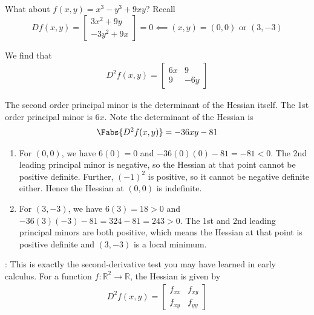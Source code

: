 \documentclass{article}
\begin{document}
What about $f(x, y) = x^3 - y^3 + 9xy$? Recall
\[
  D f(x, y) = \left[\begin{matrix}
    3x^2 + 9y \\
    -3y^2 + 9x
  \end{matrix}\right]
  = 0
  \impliedby (x, y) = (0, 0) \text{ or } (3, -3)
\]

We find that
\begin{equation}
  \begin{array}{c}
    D^2 f(x, y) = \left[\begin{matrix}
        6x & 9 \\
        9  & -6y
    \end{matrix}\right]
  \end{array}
  \nonumber
\end{equation}

The second order principal minor is the determinant of the Hessian itself. The 1st order principal minor is $6x$. Note the determinant of the Hessian is
\begin{equation}
  \begin{array}{c}
    \Fabs{D^2 f(x, y)} = -36xy - 81
  \end{array}
  \nonumber
\end{equation}

\begin{enumerate}
  \item For $(0, 0)$, we have $6(0) = 0$ and $-36(0)(0) - 81 = -81 < 0$. The 2nd leading principal minor is negative, so the Hessian at that point cannot be positive definite. Further, $(-1)^2$ is positive, so it cannot be negative definite either. Hence the Hessian at $(0, 0)$ is indefinite.

  \item For $(3, -3)$, we have $6(3) = 18 > 0$ and $-36(3)(-3) - 81 = 324 - 81 = 243 > 0$. The 1st and 2nd leading principal minors are both positive, which means the Hessian at that point is positive definite and $(3, -3)$ is a local minimum.
\end{enumerate}

\NB: This is exactly the second-derivative test you may have learned in early calculus. For a function $f: \mathbb{R}^2 \to \mathbb{R}$, the Hessian is given by
\begin{align*}
  D^2f(x, y)
  =
  \begin{bmatrix}
    f_{xx} & f_{xy} \\ f_{xy} & f_{yy}
  \end{bmatrix}
\end{align*}
\end{document}
